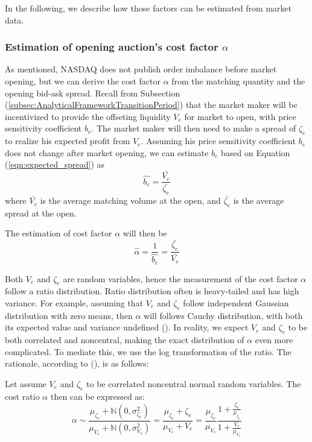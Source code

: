 In the following, we describe how those factors can be estimated from market data.

\subsubsection{Estimation of opening auction's cost factor $\alpha$}

As mentioned, NASDAQ does not publish order imbalance before market opening, but we can derive the cost factor $\alpha$ from the matching quantity and the opening bid-ask spread. Recall from Subsection (\ref{subsec:AnalyticalFrameworkTransitionPeriod}) that the market maker will be incentivized to provide the offseting liquidity $V_e$ for market to open, with price sensitivity coefficient $b_e$. The market maker will then need to make a spread of $\zeta_e$ to realize his expected profit from $V_e$. Assuming his price sensitivity coefficient $b_e$ does not change after market opening, we can estimate $b_e$ based on Equation (\ref{eqn:expected_spread}) as
\[
  \hat{b_e} = \frac{\bar{V_e}}{\bar{\zeta_e}}
\]
where $\bar{V_e}$ is the average matching volume at the open, and $\bar{\zeta_e}$ is the average spread at the open.

The estimation of cost factor $\alpha$ will then be
\[
  \hat{\alpha} = \frac{1}{\hat{b_e}}  = \frac{\bar{\zeta_e}}{\bar{V_e}}
\]

Both $V_e$ and $\zeta_e$ are random variables, hence the measurement of the cost factor $\alpha$ follow a ratio distribution. Ratio distribution often is heavy-tailed and has high variance. For example, assuming that $V_e$ and $\zeta_e$ follow independent Gaussian distribution with zero means, then $\alpha$ will follows Cauchy distribution, with both its expected value and variance undefined (\cite{Geary1930}). In reality, we expect $V_e$ and $\zeta_e$ to be both correlated and noncentral, making the exact distribution of $\alpha$ even more complicated. To mediate this, we use the log transformation of the ratio. The rationale, according to (\cite{Katz1978}), is as follows:

Let assume $V_e$ and $\zeta_e$ to be correlated noncentral normal random variables. The cost ratio $\alpha$ then can be expressed as:
\[ \alpha \sim \frac{\mu_{\zeta_e} + \mathbb{N}(0, \sigma_{\zeta_e}^2 )}{\mu_{V_e} + \mathbb{N}(0, \sigma_{V_e}^2 )}
  = \frac{\mu_{\zeta_e} + \zeta_e}{\mu_{V_e} + V_e}
  = \frac{\mu_{\zeta_e}}{\mu_{V_e}}\frac{1+ \frac{\zeta_e}{\mu_{\zeta_e}}}{1+ \frac{V_e}{\mu_{V_e}}}
\]

